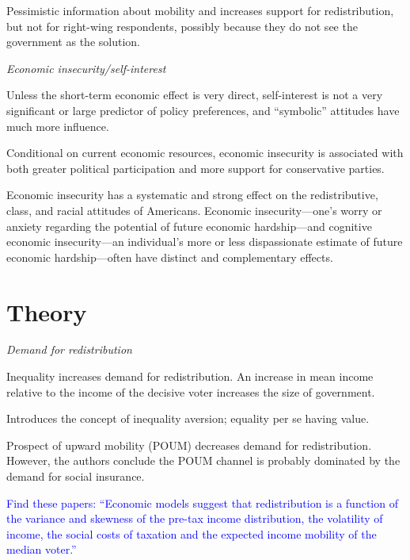 \documentclass{article}
\newcommand{\blue}[1]{\textcolor{blue}{#1}}
\newcommand{\citem}[1]{\medskip \noindent \textbf{\cite*{#1}}}
\newcommand{\textm}[1]{\medskip \noindent \textit{#1}}
\begin{document}
\citem{alesina2018intergenerational}

Pessimistic information about mobility and increases support for redistribution, but not for  right-wing respondents, possibly because they do not see the government as the solution.

\textm{Economic insecurity/self-interest}

\citem{sears1990limited} 

Unless the short-term economic effect is very direct, self-interest is not a very significant or large predictor of policy preferences, and “symbolic” attitudes have much more influence.

\citem{bossert2023economic}

Conditional on current economic resources, economic insecurity is associated with both
greater political participation and more support for conservative parties.

\citem{melcher2023economic}

Economic insecurity has a systematic and strong effect on the redistributive, class, and racial attitudes of Americans. Economic insecurity—one’s worry or anxiety regarding the potential of future economic hardship—and cognitive economic insecurity—an individual’s more or less dispassionate estimate of future economic hardship—often have distinct and complementary effects.





\section*{Theory}

\textm{Demand for redistribution}

\citem{meltzer1981rational}

Inequality increases demand for redistribution. An increase in mean income relative to the income of the decisive voter increases the size of government.

\citem{fehr1999theory}

Introduces the concept of inequality aversion; equality per se having value.

\citem{benabou2001social}

Prospect of upward mobility (POUM) decreases demand for redistribution. However, the authors conclude the POUM channel is probably dominated by the demand for social insurance.

\medskip

\blue{Find these papers: ``Economic models suggest that redistribution is a function of the variance and skewness of the pre-tax income distribution, the volatility of income, the social costs of taxation and the expected income mobility of the median voter.''}
\end{document}
